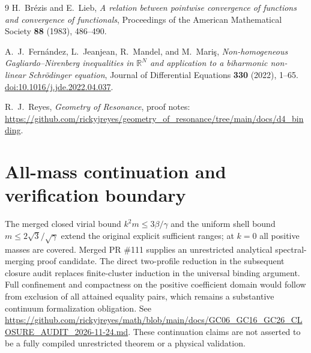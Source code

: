 \documentclass[11pt]{article}
\numberwithin{equation}{section}
\theoremstyle{remark}
\newcommand{\R}{\mathbb{R}}
\begin{document}
\begin{thebibliography}{9}
H.~Brézis and E.~Lieb,
\emph{A relation between pointwise convergence of functions and convergence
of functionals},
Proceedings of the American Mathematical Society \textbf{88} (1983),
486--490.

A.~J.~Fernández, L.~Jeanjean, R.~Mandel, and M.~Mariş,
\emph{Non-homogeneous Gagliardo--Nirenberg inequalities in $\R^N$ and
application to a biharmonic non-linear Schrödinger equation},
Journal of Differential Equations \textbf{330} (2022), 1--65.
\href{https://doi.org/10.1016/j.jde.2022.04.037}{doi:10.1016/j.jde.2022.04.037}.

R.~J.~Reyes, \emph{Geometry of Resonance}, proof notes:
\url{https://github.com/rickyjreyes/geometry_of_resonance/tree/main/docs/d4_binding}.
\end{thebibliography}


\section*{All-mass continuation and verification boundary}
The merged closed virial bound \(k^2m\le 3\beta/\gamma\) and the
uniform shell bound \(m\le2\sqrt{3}/\sqrt{\gamma}\) extend the original
explicit sufficient ranges; at \(k=0\) all positive masses are covered.
Merged PR \#111 supplies an unrestricted analytical spectral-merging
proof candidate. The direct two-profile reduction in the subsequent
closure audit replaces finite-cluster induction in the universal
binding argument. Full confinement and compactness on the positive
coefficient domain would follow from exclusion of all attained equality
pairs, which remains a substantive continuum formalization obligation.
See
\url{https://github.com/rickyjreyes/math/blob/main/docs/GC06_GC16_GC26_CLOSURE_AUDIT_2026-11-24.md}.
These continuation claims are not asserted to be a fully compiled
unrestricted theorem or a physical validation.
\end{document}
